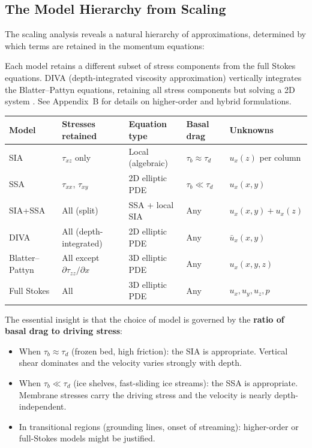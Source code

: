 \documentclass[11pt]{article}
\begin{document}
\subsection{The Model Hierarchy from Scaling}

The scaling analysis reveals a natural hierarchy of approximations, determined by which terms are retained in the momentum equations:

\begin{tcolorbox}[
  colback=blue!5,
  colframe=blue!50!black,
  title={\textbf{The Glacier Flow Model Hierarchy}},
  breakable
]
Each model retains a different subset of stress components from the full Stokes equations.  DIVA (depth-integrated viscosity approximation) vertically integrates the Blatter--Pattyn equations, retaining all stress components but solving a 2D system \cite{SchoofHindmarsh2010}.  See Appendix~B for details on higher-order and hybrid formulations.

\medskip
\centering
\begin{tabular}{lllll}
  \toprule
  Model & Stresses retained & Equation type & Basal drag & Unknowns \\
  \midrule
  SIA & $\tau_{xz}$ only & Local (algebraic) & $\tau_b \approx \tau_d$ & $u_x(z)$ per column \\[3pt]
  SSA & $\tau_{xx}$, $\tau_{xy}$ & 2D elliptic PDE & $\tau_b \ll \tau_d$ & $u_x(x,y)$ \\[3pt]
  SIA+SSA & All (split) & SSA + local SIA & Any & $u_x(x,y) + u_x(z)$ \\[3pt]
  DIVA & All (depth-integrated) & 2D elliptic PDE & Any & $\bar{u}_x(x,y)$ \\[3pt]
  Blatter--Pattyn & All except $\partial \tau_{zz}/\partial x$ & 3D elliptic PDE & Any & $u_x(x,y,z)$ \\[3pt]
  Full Stokes & All & 3D elliptic PDE & Any & $u_x,u_y,u_z,p$ \\
  \bottomrule
\end{tabular}
\label{tab:hierarchy}
\end{tcolorbox}

\noindent The essential insight is that the choice of model is governed by the \textbf{ratio of basal drag to driving stress}:
\begin{itemize}[nosep]
  \item When $\tau_b \approx \tau_d$ (frozen bed, high friction): the SIA is appropriate.  Vertical shear dominates and the velocity varies strongly with depth.
  \item When $\tau_b \ll \tau_d$ (ice shelves, fast-sliding ice streams): the SSA is appropriate.  Membrane stresses carry the driving stress and the velocity is nearly depth-independent.
  \item In transitional regions (grounding lines, onset of streaming): higher-order or full-Stokes models might be justified.
\end{itemize}
\end{document}
